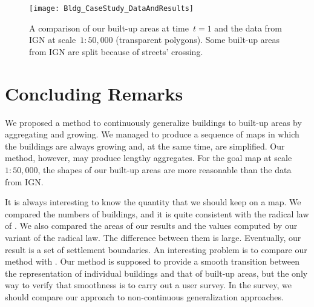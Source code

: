 \begin{figure*}[tb]
\centering
\texttt{[image: Bldg\_CaseStudy\_DataAndResults]}
\caption{A comparison of our built-up areas at time~$t=1$
	and the data from IGN
	at scale~$1:50{,}000$ (transparent polygons).
	Some built-up areas from IGN are split 
	because of streets' crossing.
}
\label{fig:ExperimentalComparison}
\end{figure*}




\section{Concluding Remarks}
\label{sec:Conclusion}

We proposed a method to continuously generalize 
buildings to built-up areas
by aggregating and growing.
We managed to produce a sequence of maps in which 
the buildings are always growing and, 
at the same time, are simplified.
Our method, however, may produce lengthy aggregates.
For the goal map at scale~$1:50{,}000$,
the shapes of our built-up areas are more reasonable 
than the data from IGN.

It is always interesting to know the quantity that
we should keep on a map.
We compared the numbers of buildings, 
and it is quite consistent 
with the radical law of \citet{Topfer1966}.
We also compared the areas of our results 
and the values computed by our variant of the radical law.
The difference between them is large.
Eventually, our result is a set of settlement boundaries. 
An interesting problem is to 
compare our method with \citet{Chaudhry2008}.
Our method is supposed to provide a smooth transition 
between the representation of individual buildings and 
that of built-up areas, 
but the only way to verify that smoothness
is to carry out a user survey.
In the survey, we should compare our approach to 
non-continuous generalization approaches.




